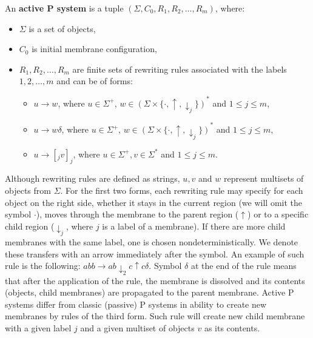 \begin{definition}
  \label{def:active_p_system}
  An  {\bf active P system} is a tuple $(\Sigma, C_0, R_1, R_2, \ldots, R_m)$, where:
  \begin{itemize}
    \item $\Sigma$ is a set of objects,
    \item $C_0$ is initial membrane configuration,
    \item $R_1,R_2,\ldots, R_m$ are finite sets of rewriting rules associated with the labels $1,2,\ldots,m$ and can be of forms:
    \begin{itemize}
      \item $u\rightarrow w$, where $u\in \Sigma^+$, $w\in (\Sigma\times\{\cdot, \uparrow, \downarrow_j\})^*$ and $1\leq j\leq m$,
      \item $u\rightarrow w\delta$, where $u\in \Sigma^+$, $w\in (\Sigma\times\{\cdot, \uparrow, \downarrow_j\})^*$ and $1\leq j\leq m$,
      \item $u\rightarrow [_j v]_j$, where $u\in \Sigma^+, v\in \Sigma^*$ and $1\leq j\leq m$.
    \end{itemize}
  \end{itemize}
\end{definition}

Although rewriting rules are defined as strings, $u,v$ and $w$ represent multisets of objects from $\Sigma$. For the first two forms, each rewriting rule may specify for each object on the right side, whether it stays in the current region (we will omit the symbol $\cdot$), moves through the membrane to the parent region ($\uparrow$)
or to a specific child region ($\downarrow_j$, where $j$ is a label of a membrane). If there are more child membranes with the same label, one is chosen nondeterministically.
We denote these transfers with an arrow immediately after the symbol.
An example of such rule is the following: $abb\rightarrow ab\downarrow_2 c\uparrow c\delta$.
Symbol $\delta$ at the end of the rule means that after the application of the rule, the membrane is dissolved and its contents (objects, child membranes) are propagated to the parent membrane.
Active P systems differ from classic (passive) P systems in ability to create new membranes by rules of the third form. Such rule will create new child membrane with a given label $j$ and a given multiset of objects $v$ as its contents.


